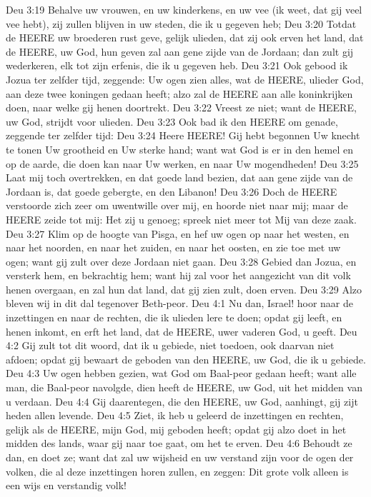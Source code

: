 Deu 3:19  Behalve uw vrouwen, en uw kinderkens, en uw vee (ik weet, dat gij veel vee hebt), zij zullen blijven in uw steden, die ik u gegeven heb;
Deu 3:20  Totdat de HEERE uw broederen rust geve, gelijk ulieden, dat zij ook erven het land, dat de HEERE, uw God, hun geven zal aan gene zijde van de Jordaan; dan zult gij wederkeren, elk tot zijn erfenis, die ik u gegeven heb.
Deu 3:21  Ook gebood ik Jozua ter zelfder tijd, zeggende: Uw ogen zien alles, wat de HEERE, ulieder God, aan deze twee koningen gedaan heeft; alzo zal de HEERE aan alle koninkrijken doen, naar welke gij henen doortrekt.
Deu 3:22  Vreest ze niet; want de HEERE, uw God, strijdt voor ulieden.
Deu 3:23  Ook bad ik den HEERE om genade, zeggende ter zelfder tijd:
Deu 3:24  Heere HEERE! Gij hebt begonnen Uw knecht te tonen Uw grootheid en Uw sterke hand; want wat God is er in den hemel en op de aarde, die doen kan naar Uw werken, en naar Uw mogendheden!
Deu 3:25  Laat mij toch overtrekken, en dat goede land bezien, dat aan gene zijde van de Jordaan is, dat goede gebergte, en den Libanon!
Deu 3:26  Doch de HEERE verstoorde zich zeer om uwentwille over mij, en hoorde niet naar mij; maar de HEERE zeide tot mij: Het zij u genoeg; spreek niet meer tot Mij van deze zaak.
Deu 3:27  Klim op de hoogte van Pisga, en hef uw ogen op naar het westen, en naar het noorden, en naar het zuiden, en naar het oosten, en zie toe met uw ogen; want gij zult over deze Jordaan niet gaan.
Deu 3:28  Gebied dan Jozua, en versterk hem, en bekrachtig hem; want hij zal voor het aangezicht van dit volk henen overgaan, en zal hun dat land, dat gij zien zult, doen erven.
Deu 3:29  Alzo bleven wij in dit dal tegenover Beth-peor.
Deu 4:1  Nu dan, Israel! hoor naar de inzettingen en naar de rechten, die ik ulieden lere te doen; opdat gij leeft, en henen inkomt, en erft het land, dat de HEERE, uwer vaderen God, u geeft.
Deu 4:2  Gij zult tot dit woord, dat ik u gebiede, niet toedoen, ook daarvan niet afdoen; opdat gij bewaart de geboden van den HEERE, uw God, die ik u gebiede.
Deu 4:3  Uw ogen hebben gezien, wat God om Baal-peor gedaan heeft; want alle man, die Baal-peor navolgde, dien heeft de HEERE, uw God, uit het midden van u verdaan.
Deu 4:4  Gij daarentegen, die den HEERE, uw God, aanhingt, gij zijt heden allen levende.
Deu 4:5  Ziet, ik heb u geleerd de inzettingen en rechten, gelijk als de HEERE, mijn God, mij geboden heeft; opdat gij alzo doet in het midden des lands, waar gij naar toe gaat, om het te erven.
Deu 4:6  Behoudt ze dan, en doet ze; want dat zal uw wijsheid en uw verstand zijn voor de ogen der volken, die al deze inzettingen horen zullen, en zeggen: Dit grote volk alleen is een wijs en verstandig volk!
